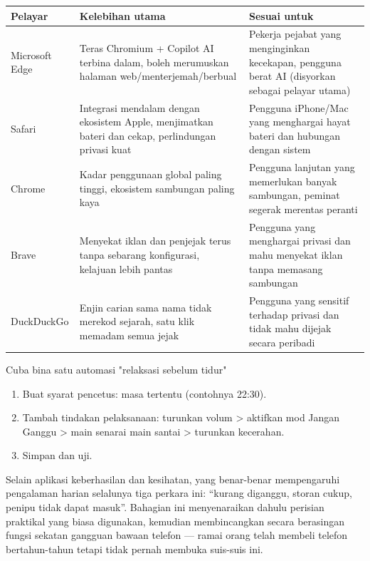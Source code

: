\begin{center}
\begin{tabularx}{\linewidth}{|X|X|X|}
\hline
\textbf{Pelayar} & \textbf{Kelebihan utama} & \textbf{Sesuai untuk} \tabularnewline
\hline
Microsoft Edge & Teras Chromium + Copilot AI terbina dalam, boleh merumuskan halaman web/menterjemah/berbual & Pekerja pejabat yang menginginkan kecekapan, pengguna berat AI (disyorkan sebagai pelayar utama) \tabularnewline
Safari & Integrasi mendalam dengan ekosistem Apple, menjimatkan bateri dan cekap, perlindungan privasi kuat & Pengguna iPhone/Mac yang menghargai hayat bateri dan hubungan dengan sistem \tabularnewline
Chrome & Kadar penggunaan global paling tinggi, ekosistem sambungan paling kaya & Pengguna lanjutan yang memerlukan banyak sambungan, peminat segerak merentas peranti \tabularnewline
Brave & Menyekat iklan dan penjejak terus tanpa sebarang konfigurasi, kelajuan lebih pantas & Pengguna yang menghargai privasi dan mahu menyekat iklan tanpa memasang sambungan \tabularnewline
DuckDuckGo & Enjin carian sama nama tidak merekod sejarah, satu klik memadam semua jejak & Pengguna yang sensitif terhadap privasi dan tidak mahu dijejak secara peribadi \tabularnewline
\hline
\end{tabularx}
\end{center}

\begin{tcbpractice}{Cuba bina satu automasi "relaksasi sebelum tidur"}
\begin{enumerate}
  \item Buat syarat pencetus: masa tertentu (contohnya 22:30).
  \item Tambah tindakan pelaksanaan: turunkan volum > aktifkan mod Jangan Ganggu > main senarai main santai > turunkan kecerahan.
  \item Simpan dan uji.
\end{enumerate}

\end{tcbpractice}


Selain aplikasi keberhasilan dan kesihatan, yang benar-benar mempengaruhi pengalaman harian selalunya tiga perkara ini: “kurang diganggu, storan cukup, penipu tidak dapat masuk”. Bahagian ini menyenaraikan dahulu perisian praktikal yang biasa digunakan, kemudian membincangkan secara berasingan fungsi sekatan gangguan bawaan telefon — ramai orang telah membeli telefon bertahun-tahun tetapi tidak pernah membuka suis-suis ini.

